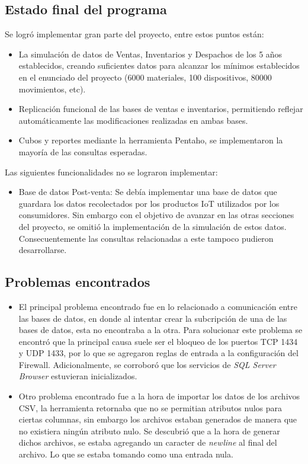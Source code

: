 \documentclass{article}
\begin{document}
\subsection {Estado final del programa}

Se logr\'o implementar gran parte del proyecto, entre estos puntos est\'an:
\begin{itemize}
\item La simulaci\'on de datos de Ventas, Inventarios y Despachos de los 5 a\~nos establecidos, creando suficientes datos para alcanzar los m\'inimos establecidos en el enunciado del proyecto (6000 materiales, 100 dispositivos, 80000 movimientos, etc).
\item Replicaci\'on funcional de las bases de ventas e inventarios, permitiendo reflejar autom\'aticamente las modificaciones realizadas en ambas bases. 
\item Cubos y reportes mediante la herramienta Pentaho, se implementaron la mayor\'ia de las consultas esperadas.
\end{itemize}

Las siguientes funcionalidades no se lograron implementar:
\begin{itemize}

\item Base de datos Post-venta: Se deb\'ia implementar una base de datos que guardara los datos recolectados por los productos IoT utilizados por los consumidores. Sin embargo con el objetivo de avanzar en las otras secciones del proyecto, se omiti\'o la implementaci\'on de la simulaci\'on de estos datos. Consecuentemente las consultas relacionadas a este tampoco pudieron desarrollarse.

\end{itemize} 

\subsection {Problemas encontrados}
\begin{itemize} 

\item El principal problema encontrado fue en lo relacionado a comunicaci\'on entre las bases de datos, en donde al intentar crear la subcripci\'on de una de las bases de datos, esta no encontraba a la otra. Para solucionar este problema se encontr\'o que la principal causa suele ser el bloqueo de los puertos TCP 1434 y UDP 1433, por lo que se agregaron reglas de entrada a la configuraci\'on del Firewall. Adicionalmente, se corrobor\'o que los servicios de \emph{SQL Server Browser} estuvieran inicializados. 

\item Otro problema encontrado fue a la hora de importar los datos de los archivos CSV, la herramienta retornaba que no se permitian atributos nulos para ciertas columnas, sin embargo los archivos estaban generados de manera que no existiera ning\'un atributo nulo. Se descubri\'o que a la hora de generar dichos archivos, se estaba agregando un caracter de \emph{newline} al final del archivo. Lo que se estaba tomando como una entrada nula.

\end{itemize}
\end{document}
